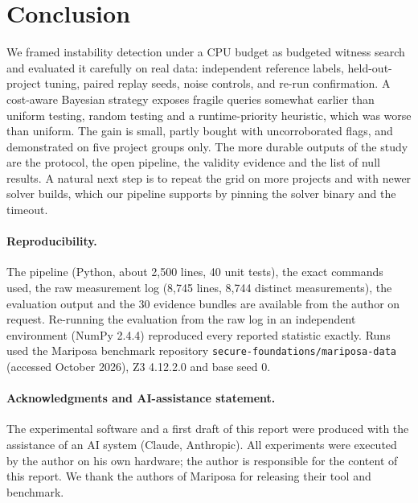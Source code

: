 \documentclass[11pt]{article}
\begin{document}
\section{Conclusion}
\label{sec:conclusion}

We framed instability detection under a CPU budget as budgeted witness search and evaluated it carefully on real data: independent reference labels, held-out-project tuning, paired replay seeds, noise controls, and re-run confirmation. A cost-aware Bayesian strategy exposes fragile queries somewhat earlier than uniform testing, random testing and a runtime-priority heuristic, which was worse than uniform. The gain is small, partly bought with uncorroborated flags, and demonstrated on five project groups only. The more durable outputs of the study are the protocol, the open pipeline, the validity evidence and the list of null results. A natural next step is to repeat the grid on more projects and with newer solver builds, which our pipeline supports by pinning the solver binary and the timeout.

\paragraph{Reproducibility.} The pipeline (Python, about 2{,}500 lines, 40 unit tests), the exact commands used, the raw measurement log (8{,}745 lines, 8{,}744 distinct measurements), the evaluation output and the 30 evidence bundles are available from the author on request. Re-running the evaluation from the raw log in an independent environment (NumPy 2.4.4) reproduced every reported statistic exactly. Runs used the Mariposa benchmark repository \texttt{secure-foundations/}\allowbreak\texttt{mariposa-data} (accessed October 2026), Z3 4.12.2.0 and base seed 0.

\paragraph{Acknowledgments and AI-assistance statement.} The experimental software and a first draft of this report were produced with the assistance of an AI system (Claude, Anthropic). All experiments were executed by the author on his own hardware; the author is responsible for the content of this report. We thank the authors of Mariposa for releasing their tool and benchmark.
\end{document}

